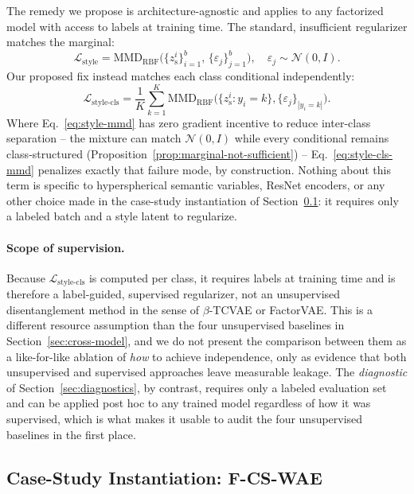 \documentclass[10pt,letterpaper]{article}
\newcommand{\ours}{F-CS-WAE}
\newcommand{\zs}{z_{\mathrm{s}}}
\newcommand{\MMD}{\mathrm{MMD}}
\begin{document}
The remedy we propose is architecture-agnostic and applies to any
factorized model with access to labels at training time. The standard,
insufficient regularizer matches the marginal:
\begin{equation}
  \mathcal{L}_{\mathrm{style}} = \MMD_{\mathrm{RBF}}\!\bigl(\{\zs^i\}_{i=1}^b,\,\{\varepsilon_j\}_{j=1}^b\bigr),
  \quad \varepsilon_j\sim\mathcal N(0,I).
  \label{eq:style-mmd}
\end{equation}
Our proposed fix instead matches each class conditional independently:
\begin{equation}
  \mathcal{L}_{\mathrm{style\text{-}cls}} = \frac{1}{K}\sum_{k=1}^{K}
    \MMD_{\mathrm{RBF}}\!\bigl(\{\zs^i:y_i{=}k\},\{\varepsilon_j\}_{|y_i=k|}\bigr).
  \label{eq:style-cls-mmd}
\end{equation}
Where Eq.~\ref{eq:style-mmd} has zero gradient incentive to reduce
inter-class separation -- the mixture can match $\mathcal N(0,I)$ while
every conditional remains class-structured
(Proposition~\ref{prop:marginal-not-sufficient}) -- Eq.~\ref{eq:style-cls-mmd}
penalizes exactly that failure mode, by construction. Nothing about this
term is specific to hyperspherical semantic variables, ResNet encoders, or
any other choice made in the case-study instantiation of
Section~\ref{sec:instantiation}: it requires only a labeled batch and a
style latent to regularize.

\paragraph{Scope of supervision.}
Because $\mathcal{L}_{\mathrm{style\text{-}cls}}$ is computed per class, it
requires labels at training time and is therefore a label-guided,
supervised regularizer, not an unsupervised disentanglement method in the
sense of $\beta$-TCVAE or FactorVAE. This is a different resource
assumption than the four unsupervised baselines in
Section~\ref{sec:cross-model}, and we do not present the comparison between
them as a like-for-like ablation of \emph{how} to achieve independence, only
as evidence that both unsupervised and supervised approaches leave
measurable leakage. The \emph{diagnostic} of Section~\ref{sec:diagnostics},
by contrast, requires only a labeled evaluation set and can be applied
post hoc to any trained model regardless of how it was supervised, which is
what makes it usable to audit the four unsupervised baselines in the first
place.

\subsection{Case-Study Instantiation: \ours{}}
\label{sec:instantiation}
\end{document}
